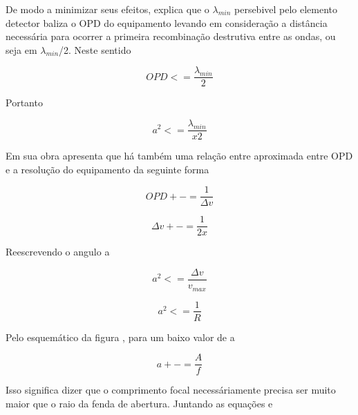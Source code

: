 \documentclass[oneside,openright,12pt]{ufsm_2021} %
\begin{document}
    \par De modo a minimizar seus efeitos, \cite{Livro1} explica que o $\lambda$$_{min}$ persebivel pelo elemento detector baliza o OPD do equipamento levando em consideração a distância necessária para ocorrer a primeira recombinação destrutiva entre as ondas, ou seja em $\lambda$$_{min}$/2. Neste sentido

    \begin{equation}
        OPD <= \frac{\lambda_{min}}{2}
    \end{equation}

    \par Portanto

    \begin{equation}
        a^2 <=\frac{\lambda_{min}}{x2}
    \end{equation}

    \par Em sua obra \cite{LivroFT} apresenta que há também uma relação entre aproximada entre OPD e a resolução do equipamento 
    da seguinte forma

    \begin{equation}
        OPD +-=\frac{1}{\Delta v}
    \end{equation}

    \begin{equation}
        \Delta v +-= \frac{1}{2x}
    \end{equation}
    
    \par Reescrevendo o angulo a

    \begin{equation}
        a^2 <= \frac{\Delta v}{v_{max}}
    \end{equation}

    \begin{equation}
        a^2 <= \frac{1}{R} 
    \end{equation}

    \par Pelo esquemático da figura \cite{LivroFT}, para um baixo valor de a
    
    \begin{equation}
        a +-=\frac{A}{f}
    \end{equation}

    \par Isso significa dizer que o comprimento focal necessáriamente precisa ser muito maior que o raio da fenda de abertura. Juntando as equações \cite{Eq?} e \cite{Eq?}
\end{document}
